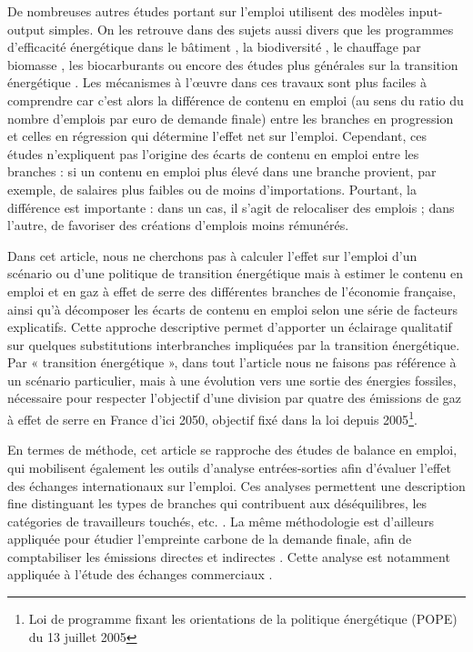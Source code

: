 De nombreuses autres études portant sur l'emploi utilisent des modèles input-output simples. On les retrouve dans des sujets aussi divers que les programmes d'efficacité énergétique dans le bâtiment \citep{Scott2008}, la biodiversité \citep{DeBeir2015}, le chauffage par biomasse \citep{Madlener2007}, les biocarburants \citep{Neuwahl2008} ou encore des études plus générales sur la transition énergétique \citep{Quirion2013}. 
Les mécanismes à l’œuvre dans ces travaux sont plus faciles à comprendre car c’est alors la différence de contenu en emploi (au sens du ratio du nombre d'emplois par euro de demande finale) entre les branches en progression et celles en régression qui détermine l’effet net sur l’emploi. Cependant, ces études n’expliquent pas l’origine des écarts de contenu en emploi entre les branches : si un contenu en emploi plus élevé dans une branche provient, par exemple, de salaires plus faibles ou de moins d’importations. 
Pourtant, la différence est importante : dans un cas, il s’agit de relocaliser des emplois ; dans l’autre, de favoriser des créations d’emplois moins rémunérés.

Dans cet article, nous ne cherchons pas à calculer l’effet sur l’emploi d’un scénario ou d’une politique de transition énergétique mais à estimer le contenu en emploi et en gaz à effet de serre des différentes branches de l’économie française, ainsi qu’à décomposer les écarts de contenu en emploi selon une série de facteurs explicatifs. Cette approche descriptive permet d’apporter un éclairage qualitatif sur quelques substitutions interbranches impliquées par la transition énergétique. Par « transition énergétique », dans tout l’article nous ne faisons pas référence à un scénario particulier, mais à une évolution vers une sortie des énergies fossiles, nécessaire pour respecter l’objectif d’une division par quatre des émissions de gaz à effet de serre en France d’ici 2050, objectif fixé dans la loi depuis 2005\footnote{Loi de programme fixant les orientations de la politique énergétique (POPE) du 13 juillet 2005}.

En termes de méthode, cet article se rapproche des études de balance en emploi, qui mobilisent également les outils d’analyse entrées-sorties afin d’évaluer l’effet des échanges internationaux sur l’emploi. Ces analyses permettent une description fine distinguant les types de branches qui contribuent aux déséquilibres, les catégories de travailleurs touchés, etc. \citep{Guimbert2002}. La même méthodologie est d’ailleurs appliquée pour étudier l’empreinte carbone de la demande finale, afin de comptabiliser les émissions directes et indirectes \citep{Xu2014, Lenglart2010}. Cette analyse est notamment appliquée à l’étude des échanges commerciaux \citep{Dong2010}.

